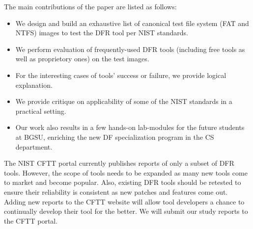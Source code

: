The main contributions of the paper are listed as follows:
\begin{itemize}
\item We design and build an exhaustive list of canonical test file system (FAT and NTFS) images to test the DFR tool per NIST standards. 
\item We perform evaluation of frequently-used DFR tools (including free tools as well as proprietory ones) on the test images.
\item For the interesting cases of tools' success or failure, we provide logical explanation.
\item We provide critique on applicability of some of the NIST standards in a practical setting. 
\item Our work also results in a few hands-on lab-modules for the future students at BGSU, enriching the new DF specialization program in the CS department.
\end{itemize}

The NIST CFTT portal currently publishes reports of only a subset of DFR tools. 
However, the scope of tools needs to be expanded as many new tools come to market and become popular.
Also, existing DFR tools should be retested to ensure their reliability is consistent 
as new patches and features come out. 
Adding new reports to the CFTT website will allow tool developers a 
chance to continually develop their tool for the better. We will submit our study reports to the CFTT portal.
